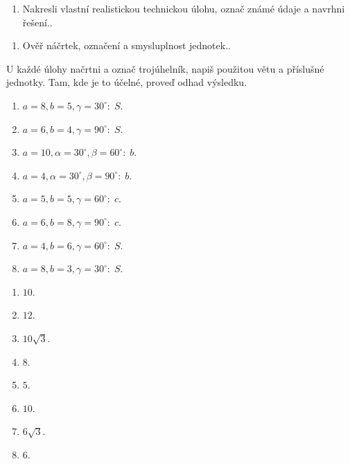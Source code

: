 \documentclass[11pt,a4paper]{article}
\begin{document}
\begin{zadaniReseniBox}[title={Rozšíření 1}]
\begin{enumerate}[label=\alph*)]
\item Nakresli vlastní realistickou technickou úlohu, označ známé údaje a navrhni řešení..
\end{enumerate}
\tcblower
\begin{enumerate}[label=\alph*)]
\item Ověř náčrtek, označení a smysluplnost jednotek..
\end{enumerate}
\end{zadaniReseniBox}
U každé úlohy načrtni a označ trojúhelník, napiš použitou větu a příslušné jednotky. Tam, kde je to účelné, proveď odhad výsledku.
\begin{zadaniReseniBox}[title={Domácí úkol}]
\begin{enumerate}[label=\alph*)]
\item $a=8,b=5,\gamma=30^\circ:\;S$.
\item $a=6,b=4,\gamma=90^\circ:\;S$.
\item $a=10,\alpha=30^\circ,\beta=60^\circ:\;b$.
\item $a=4,\alpha=30^\circ,\beta=90^\circ:\;b$.
\item $a=5,b=5,\gamma=60^\circ:\;c$.
\item $a=6,b=8,\gamma=90^\circ:\;c$.
\item $a=4,b=6,\gamma=60^\circ:\;S$.
\item $a=8,b=3,\gamma=30^\circ:\;S$.
\end{enumerate}
\tcblower
\begin{enumerate}[label=\alph*)]
\item $10$.
\item $12$.
\item $10\sqrt3$.
\item $8$.
\item $5$.
\item $10$.
\item $6\sqrt3$.
\item $6$.
\end{enumerate}
\end{zadaniReseniBox}
\end{document}

